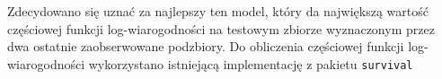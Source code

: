 Zdecydowano się uznać za najlepszy ten model, który da największą wartość częściowej funkcji log-wiarogodności na testowym zbiorze wyznaczonym przez dwa ostatnie zaobserwowane podzbiory.  Do obliczenia częściowej funkcji log-wiarogodności wykorzystano istniejącą implementację z pakietu \texttt{survival}

\begin{Shaded}
\begin{Highlighting}[]
\StringTok{ }
  \NormalTok{(}\NormalTok{=}\NormalTok{), }\NormalTok{data)\$loglik[}\NormalTok{]}
\NormalTok{\}}
\end{Highlighting}
\end{Shaded}


